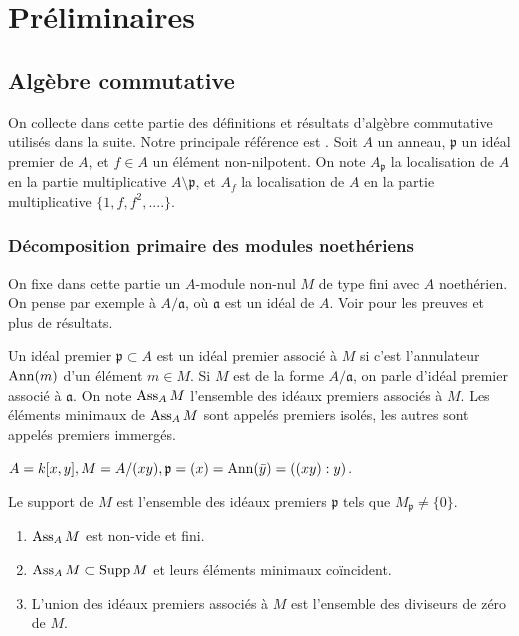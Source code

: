 \chapter{Préliminaires}

\section{Algèbre commutative}

On collecte dans cette partie des définitions et résultats d'algèbre commutative utilisés dans la suite. Notre principale référence est \cite{Matsumura}. Soit $A$ un anneau, $\mathfrak{p}$ un idéal premier de $A$, et $f\in A$ un élément non-nilpotent. On note $A_\mathfrak{p}$ la localisation de $A$ en la partie multiplicative $A\setminus \mathfrak{p}$, et $A_f$ la localisation de $A$ en la partie multiplicative $\lbrace 1, f, f^2, ....\rbrace$.


\subsection{Décomposition primaire des modules noethériens}

On fixe dans cette partie un $A$-module non-nul $M$ de type fini avec $A$ noethérien. On pense par exemple à $A/\mathfrak{a}$, où $\mathfrak{a}$ est un idéal de $A$. Voir \cite[Chap. 6]{Matsumura} pour les preuves et plus de résultats.

\begin{defn}
Un idéal premier $\mathfrak{p}\subset A$ est un idéal premier associé à $M$ si c'est l'annulateur $\operatorname{Ann}(m)$ d'un élément $m\in M$. Si $M$ est de la forme $A/\mathfrak{a}$, on parle d'idéal premier associé à $\mathfrak{a}$. On note $\operatorname{Ass}_AM$ l'ensemble des idéaux premiers associés à $M$. Les éléments minimaux de $\operatorname{Ass}_AM$ sont appelés premiers isolés, les autres sont appelés premiers immergés.
\end{defn}

\begin{ex}
$A=k[x,y], M=A/(xy),\mathfrak{p}=(x)=\operatorname{Ann}(\bar{y})=((xy):y)$.
\end{ex}

\begin{defn}
Le support de $M$ est l'ensemble des idéaux premiers $\mathfrak{p}$ tels que $M_\mathfrak{p}\neq \lbrace 0\rbrace$.
\end{defn}

\begin{prop}\label{AssociatedPrimesProp1}
\begin{enumerate}
\item $\operatorname{Ass}_A M$ est non-vide et fini.
\item $\operatorname{Ass}_A M\subset \operatorname{Supp} M$ et leurs éléments minimaux coïncident.
\item L'union des idéaux premiers associés à $M$ est l'ensemble des diviseurs de zéro de $M$.
\end{enumerate}
\end{prop}

